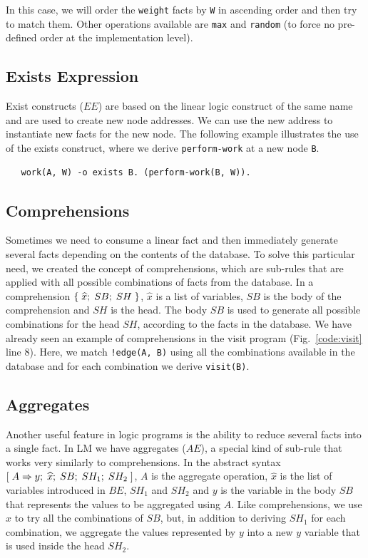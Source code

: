 In this case, we will order the \texttt{weight} facts by \texttt{W} in ascending
order and then try to match them. Other operations available are \texttt{max}
and \texttt{random} (to force no pre-defined order at the implementation level).

\subsection{Exists Expression}

Exist constructs ($EE$) are based on the linear logic construct of the same name
and are used to create new node addresses. We can use the new address to
instantiate new facts for the new node.  The following example illustrates the
use of the exists construct, where we derive \texttt{perform-work} at a new node
\texttt{B}.

{\small
\begin{Verbatim}
   work(A, W) -o exists B. (perform-work(B, W)).
\end{Verbatim}
}

\subsection{Comprehensions}

Sometimes we need to consume a linear fact and then immediately generate several
facts depending on the contents of the database. To solve this particular need,
we created the concept of comprehensions, which are sub-rules that are
applied with all possible combinations of facts from the database. In a
comprehension $\{ \; \widehat{x}; \; SB; \; SH \; \}$, $\widehat{x}$ is a
list of variables, $SB$ is the body of the comprehension and $SH$ is the
head.  The body $SB$ is used to generate all possible combinations for the
head $SH$, according to the facts in the database.  We have already seen
an example of comprehensions in the visit program (Fig.~\ref{code:visit}
line 8).  Here, we match \texttt{!edge(A, B)} using all the
combinations available in the database and for each combination we derive
\texttt{visit(B)}.

\subsection{Aggregates}

Another useful feature in logic programs is the ability to reduce several facts
into a single fact.  In LM we have aggregates ($AE$), a special kind of sub-rule
that works very similarly to comprehensions.  In the abstract syntax
$[\; A \Rightarrow y; \; \widehat{x}; \; SB; \; SH_1; \; SH_2 \;]$, $A$ is the aggregate operation,
$\widehat{x}$ is the list of variables introduced in $BE$, $SH_1$ and $SH_2$
and $y$ is the variable in the body $SB$ that represents the values to be
aggregated using $A$. Like comprehensions, we use $\widehat{x}$ to try all
the combinations of $SB$, but, in addition to deriving $SH_1$ for each
combination, we aggregate the values represented by $y$ into a new $y$
variable that is used inside the head $SH_2$.

